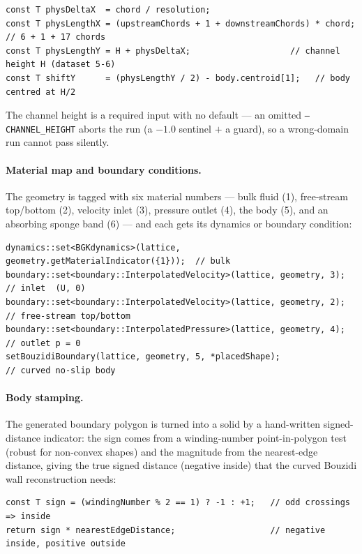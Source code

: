\begin{lstlisting}[style=cpp]
const T physDeltaX  = chord / resolution;
const T physLengthX = (upstreamChords + 1 + downstreamChords) * chord;  // 6 + 1 + 17 chords
const T physLengthY = H + physDeltaX;                    // channel height H (dataset 5-6)
const T shiftY      = (physLengthY / 2) - body.centroid[1];   // body centred at H/2
\end{lstlisting}

The channel height is a required input with no default --- an omitted \texttt{--CHANNEL\_HEIGHT} aborts
the run (a $-1.0$ sentinel $+$ a guard), so a wrong-domain run cannot pass silently.

\paragraph{Material map and boundary conditions.} The geometry is tagged with six material numbers ---
bulk fluid (1), free-stream top/bottom (2), velocity inlet (3), pressure outlet (4), the body (5), and
an absorbing sponge band (6) --- and each gets its dynamics or boundary condition:

\begin{lstlisting}[style=cpp]
dynamics::set<BGKdynamics>(lattice, geometry.getMaterialIndicator({1}));  // bulk
boundary::set<boundary::InterpolatedVelocity>(lattice, geometry, 3);      // inlet  (U, 0)
boundary::set<boundary::InterpolatedVelocity>(lattice, geometry, 2);      // free-stream top/bottom
boundary::set<boundary::InterpolatedPressure>(lattice, geometry, 4);      // outlet p = 0
setBouzidiBoundary(lattice, geometry, 5, *placedShape);                   // curved no-slip body
\end{lstlisting}

\paragraph{Body stamping.} The generated boundary polygon is turned into a solid by a hand-written
signed-distance indicator: the sign comes from a winding-number point-in-polygon test (robust for
non-convex shapes) and the magnitude from the nearest-edge distance, giving the true signed distance
(negative inside) that the curved Bouzidi wall reconstruction needs:

\begin{lstlisting}[style=cpp]
const T sign = (windingNumber % 2 == 1) ? -1 : +1;   // odd crossings => inside
return sign * nearestEdgeDistance;                   // negative inside, positive outside
\end{lstlisting}

